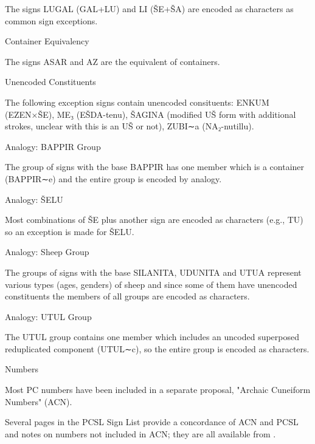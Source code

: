 \par The signs LUGAL (GAL+LU) and LI (ŠE+ŠA) are encoded as
      characters as common sign exceptions.

\Hhhh{}Container Equivalency


\par The signs ASAR and AZ are the equivalent of containers.

\Hhhh{}Unencoded Constituents


\par The following exception signs contain unencoded consituents:
      ENKUM (EZEN×ŠE), ME₃ (EŠDA-tenu), ŠAGINA (modified UŠ form with
      additional strokes, unclear with this is an UŠ or not), ZUBI∼a
      (NA₂-nutillu).

\Hhhh{}Analogy: BAPPIR Group


\par The group of signs with the base BAPPIR has one member which
      is a container (BAPPIR∼e) and the entire group is encoded by
      analogy.

\Hhhh{}Analogy: ŠELU


\par Most combinations of ŠE plus another sign are encoded as
      characters (e.g., TU) so an exception is made for ŠELU.

\Hhhh{}Analogy: Sheep Group


\par The groups of signs with the base SILANITA, UDUNITA and UTUA
      represent various types (ages, genders) of sheep and since some
      of them have unencoded constituents the members of all groups
      are encoded as characters.

\Hhhh{}Analogy: UTUL Group


\par The UTUL group contains one member which includes an uncoded
      superposed reduplicated component (UTUL∼c), so the entire group
      is encoded as characters.

\Hh{}Numbers


\par Most PC numbers have been included in a separate proposal,
      "Archaic Cuneiform Numbers" (ACN).


\par Several pages in the PCSL Sign List provide a concordance of
      ACN and PCSL and notes on numbers not included in ACN; they are
      all available from .


